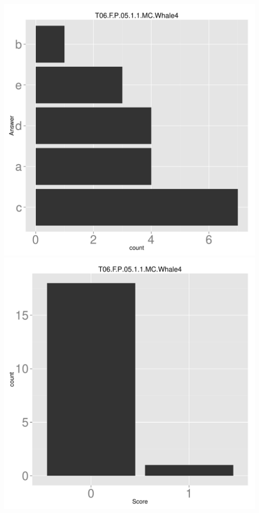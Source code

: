\documentclass[12pt,nohyper]{tufte-handout}\usepackage[]{graphicx}\usepackage[]{color}
\begin{document}
\begin{center} \includegraphics[width=.45\linewidth]{Topic06_63_answer} \includegraphics[width=.45\linewidth]{Topic06_63_score} \end{center} 
\end{document}
